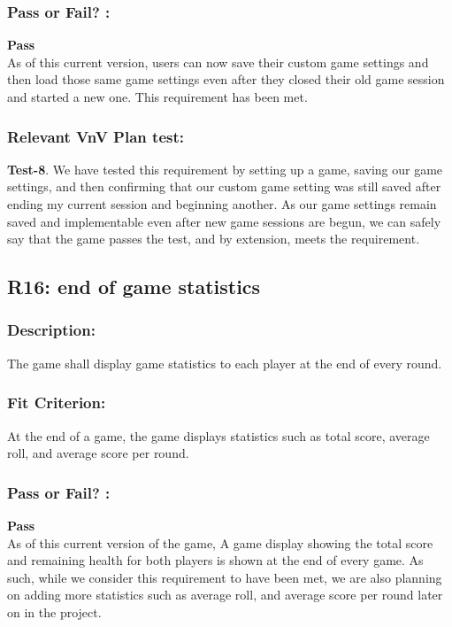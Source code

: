 \documentclass[12pt, titlepage]{article}
\begin{document}
\subsubsection*{Pass or Fail? :} 

 \noindent \textbf{Pass}\\
 
 \noindent As of this current version, users can now save their custom game settings and then load those same game settings even after they closed their old game session and started a new one. This requirement has been met.

\subsubsection*{Relevant VnV Plan test: } \textbf{Test-8}. We have tested this requirement by setting up a game, saving our game settings, and then confirming that our custom game setting was still saved after ending my current session and beginning another. As our game settings remain saved and implementable even after new game sessions are begun, we can safely say that the game passes the test, and by extension, meets the requirement.


\subsection{R16: end of game statistics} 
\label{R16} 

\subsubsection*{Description:}The game shall display game statistics to each player at the end of every round.

\subsubsection*{Fit Criterion:}At the end of a game, the game displays statistics such as total score, average roll, and average score per round.

\subsubsection*{Pass or Fail? :} 

 \noindent \textbf{Pass}\\
 
 \noindent As of this current version of the game, A game display showing the total score and remaining health for both players is shown at the end of every game. As such, while we consider this requirement to have been met, we are also planning on adding more statistics such as average roll, and average score per round later on in the project.
 
\end{document}
